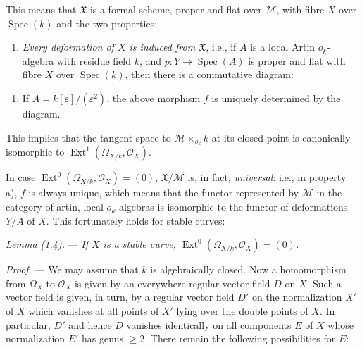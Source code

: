 \documentclass[10pt]{article}
\newcommand{\Spec}{\operatorname{Spec}}
\newcommand{\Ext}{\operatorname{Ext}}
\newcommand{\cO}{\mathcal O}
\newcommand{\cM}{\mathcal M}
\newcommand{\cX}{\mathfrak X}
\newcommand{\eps}{\varepsilon}
\begin{document}
This means that $\cX$ is a formal scheme, proper and flat over $\cM$, with fibre $X$ over $\Spec(k)$ and the two properties:

\begin{enumerate}[label=\emph{\alph*)}]
\item \emph{Every deformation of $X$ is induced from $\cX$}, i.e., if $A$ is a local Artin $o_k$-algebra with residue field $k$, and $p:Y\to\Spec(A)$ is proper and flat with fibre $X$ over $\Spec(k)$, then there is a commutative diagram:
\end{enumerate}

\begin{center}
\end{center}

\begin{enumerate}[label=\emph{\alph*)},resume]
\item If $A=k[\eps]/(\eps^2)$, the above morphism $f$ is uniquely determined by the diagram.
\end{enumerate}
This implies that the tangent space to $\cM\times_{o_k}k$ at its closed point is canonically isomorphic to $\Ext^1(\Omega_{X/k},\cO_X)$.

In case $\Ext^0(\Omega_{X/k},\cO_X)=(0)$, $\cX/\cM$ is, in fact, \emph{universal}: i.e., in property a), $f$ is always unique, which means that the functor represented by $\cM$ in the category of artin, local $o_k$-algebras is isomorphic to the functor of deformations $Y/A$ of $X$. This fortunately holds for stable curves:

\medskip
\noindent\emph{Lemma (1.4).} --- \emph{If $X$ is a stable curve, $\Ext^0(\Omega_{X/k},\cO_X)=(0)$.}

\noindent\emph{Proof.} --- We may assume that $k$ is algebraically closed. Now a homomorphism from $\Omega_X$ to $\cO_X$ is given by an everywhere regular vector field $D$ on $X$. Such a vector field is given, in turn, by a regular vector field $D'$ on the normalization $X'$ of $X$ which vanishes at all points of $X'$ lying over the double points of $X$. In particular, $D'$ and hence $D$ vanishes identically on all components $E$ of $X$ whose normalization $E'$ has genus $\geq 2$. There remain the following possibilities for $E$:
\end{document}
